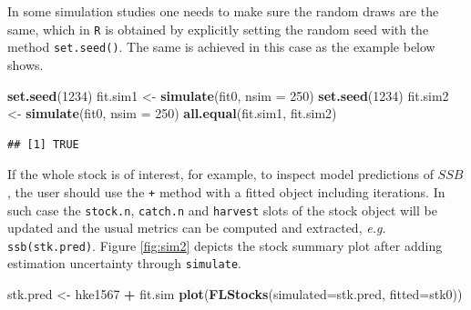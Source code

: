 \documentclass[
]{book}
\newenvironment{Shaded}{\begin{snugshade}}{\end{snugshade}}
\newcommand{\AttributeTok}[1]{\textcolor[rgb]{0.13,0.29,0.53}{#1}}
\newcommand{\DecValTok}[1]{\textcolor[rgb]{0.00,0.00,0.81}{#1}}
\newcommand{\FunctionTok}[1]{\textcolor[rgb]{0.13,0.29,0.53}{\textbf{#1}}}
\newcommand{\NormalTok}[1]{#1}
\newcommand{\OtherTok}[1]{\textcolor[rgb]{0.56,0.35,0.01}{#1}}
\newcommand{\SpecialCharTok}[1]{\textcolor[rgb]{0.81,0.36,0.00}{\textbf{#1}}}
\begin{document}
In some simulation studies one needs to make sure the random draws are the same, which in \texttt{R} is obtained by explicitly setting the random seed with the method \texttt{set.seed()}. The same is achieved in this case as the example below shows.

\begin{Shaded}
\begin{Highlighting}[]
\FunctionTok{set.seed}\NormalTok{(}\DecValTok{1234}\NormalTok{)}
\NormalTok{fit.sim1 }\OtherTok{\textless{}{-}} \FunctionTok{simulate}\NormalTok{(fit0, }\AttributeTok{nsim =} \DecValTok{250}\NormalTok{)}
\FunctionTok{set.seed}\NormalTok{(}\DecValTok{1234}\NormalTok{)}
\NormalTok{fit.sim2 }\OtherTok{\textless{}{-}} \FunctionTok{simulate}\NormalTok{(fit0, }\AttributeTok{nsim =} \DecValTok{250}\NormalTok{)}
\FunctionTok{all.equal}\NormalTok{(fit.sim1, fit.sim2)}
\end{Highlighting}
\end{Shaded}

\begin{verbatim}
## [1] TRUE
\end{verbatim}

If the whole stock is of interest, for example, to inspect model predictions of \(SSB\), the user should use the \texttt{+} method with a fitted object including iterations. In such case the \texttt{stock.n}, \texttt{catch.n} and \texttt{harvest} slots of the stock object will be updated and the usual metrics can be computed and extracted, \emph{e.g.} \texttt{ssb(stk.pred)}. Figure \ref{fig:sim2} depicts the stock summary plot after adding estimation uncertainty through \texttt{simulate}.

\begin{Shaded}
\begin{Highlighting}[]
\NormalTok{stk.pred }\OtherTok{\textless{}{-}}\NormalTok{ hke1567 }\SpecialCharTok{+}\NormalTok{ fit.sim}
\FunctionTok{plot}\NormalTok{(}\FunctionTok{FLStocks}\NormalTok{(}\AttributeTok{simulated=}\NormalTok{stk.pred, }\AttributeTok{fitted=}\NormalTok{stk0))}
\end{Highlighting}
\end{Shaded}
\end{document}
